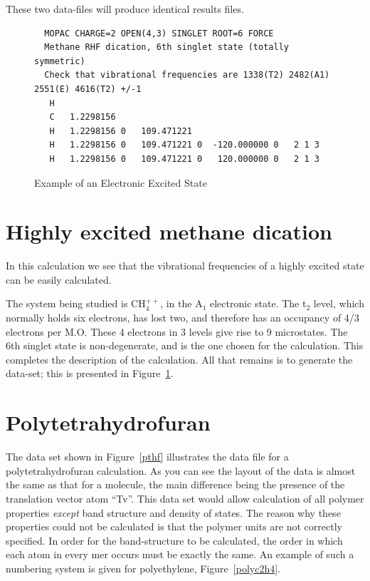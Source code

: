 These two data-files will produce identical results files.
\begin{figure}
\begin{makeimage}
\end{makeimage}
\compresstable
\begin{verbatim}
  MOPAC CHARGE=2 OPEN(4,3) SINGLET ROOT=6 FORCE
  Methane RHF dication, 6th singlet state (totally symmetric)
  Check that vibrational frequencies are 1338(T2) 2482(A1) 2551(E) 4616(T2) +/-1
   H
   C   1.2298156
   H   1.2298156 0   109.471221
   H   1.2298156 0   109.471221 0  -120.000000 0   2 1 3
   H   1.2298156 0   109.471221 0   120.000000 0   2 1 3
\end{verbatim}
\caption{\label{ech4}Example of an Electronic Excited State}
\end{figure}

\section{Highly excited methane dication}

In this calculation we see that the vibrational frequencies of a highly excited
state can be easily calculated. 

The system being studied is CH$_4^{++}$, in the A$_1$ electronic state. The
t$_2$ level, which normally holds six electrons, has lost two, and therefore
has an occupancy of 4/3 electrons per M.O.  These 4 electrons in 3 levels give
rise to 9 microstates.  The 6th singlet state is non-degenerate, and is the one
chosen for the  calculation.  This completes the description of the
calculation.  All that remains is to generate the data-set; this is presented
in Figure~\ref{ech4}.

\section{Polytetrahydrofuran}
The data set shown in Figure~\ref{pthf} illustrates the data file for a 
polytetrahydrofuran calculation. As you can
see the layout of the data is almost the same as that for a molecule, the main 
difference being the presence of the translation vector atom ``Tv''. This data
set would allow calculation of all polymer properties {\em except} band
structure and density of states.  The reason why these properties could not be
calculated is that the polymer units are not correctly specified. In order for
the band-structure to be calculated, the order in which each atom in every mer
occurs must be exactly the same.  An example of such a  numbering system is
given for polyethylene, Figure~\ref{polyc2h4}.

